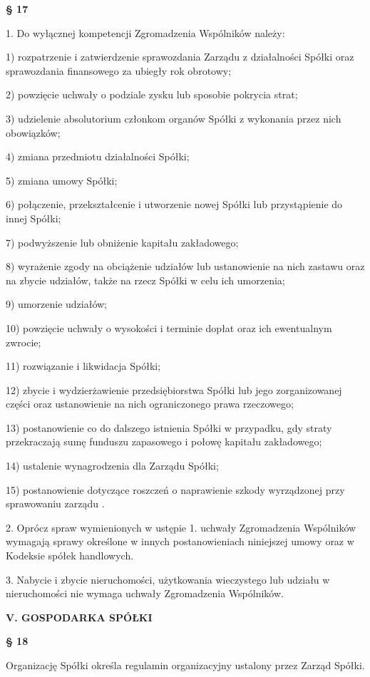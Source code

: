 \centerline{\large\textbf{§ 17}}

1. Do wyłącznej kompetencji Zgromadzenia Wspólników należy:

1) rozpatrzenie i zatwierdzenie sprawozdania Zarządu z działalności Spółki oraz sprawozdania finansowego za ubiegły rok obrotowy;

2) powzięcie uchwały o podziale zysku lub sposobie pokrycia strat;

3) udzielenie absolutorium członkom organów Spółki z wykonania przez nich obowiązków;

4) zmiana przedmiotu działalności Spółki;

5) zmiana umowy Spółki;

6) połączenie, przekształcenie i utworzenie nowej Spółki lub przystąpienie do innej Spółki;

7) podwyższenie lub obniżenie kapitału zakładowego;

8) wyrażenie zgody na obciążenie udziałów lub ustanowienie na nich zastawu oraz na zbycie udziałów, także na rzecz Spółki w celu ich umorzenia;

9) umorzenie udziałów;

10) powzięcie uchwały o wysokości i terminie dopłat oraz ich ewentualnym zwrocie;

11) rozwiązanie i likwidacja Spółki;

12) zbycie i wydzierżawienie przedsiębiorstwa Spółki lub jego zorganizowanej części oraz ustanowienie na nich ograniczonego prawa rzeczowego;

13) postanowienie co do dalszego istnienia Spółki w przypadku, gdy straty przekraczają sumę funduszu zapasowego i połowę kapitału zakładowego;

14) ustalenie wynagrodzenia dla  Zarządu Spółki;

15) postanowienie dotyczące roszczeń o naprawienie szkody wyrządzonej przy sprawowaniu zarządu .

2. Oprócz spraw wymienionych w ustępie 1. uchwały Zgromadzenia Wspólników wymagają sprawy określone w innych postanowieniach niniejszej umowy oraz w Kodeksie spółek handlowych.

3. Nabycie i zbycie nieruchomości, użytkowania wieczystego lub udziału w nieruchomości nie wymaga uchwały Zgromadzenia Wspólników.\\

\centerline{\large\textbf{V. GOSPODARKA SPÓŁKI}}

\centerline{\large\textbf{§ 18}}

Organizację Spółki określa regulamin organizacyjny ustalony przez Zarząd Spółki.\\


